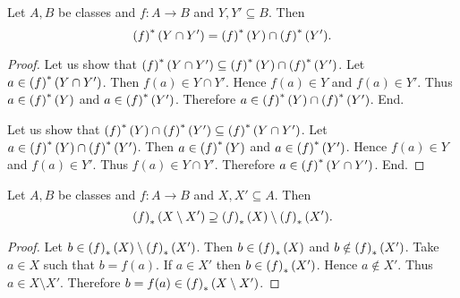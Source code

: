 \documentclass[../../set-theory/set-theory.tex]{subfiles}
\begin{document}
  \begin{forthel}
    \begin{proposition}
      Let $A, B$ be classes and $f : A \to B$ and $Y, Y' \subseteq B$.
      Then \[ \left(f\right)^{*}(Y \cap Y') = \left(f\right)^{*}(Y) \cap \left(f\right)^{*}(Y'). \]
    \end{proposition}
    \begin{proof}
      Let us show that $\left(f\right)^{*}(Y \cap Y') \subseteq \left(f\right)^{*}(Y) \cap \left(f\right)^{*}(Y')$.
        Let $a \in \left(f\right)^{*}(Y \cap Y')$.
        Then $f(a) \in Y \cap Y'$.
        Hence $f(a) \in Y$ and $f(a) \in Y'$.
        Thus $a \in \left(f\right)^{*}(Y)$ and $a \in \left(f\right)^{*}(Y')$.
        Therefore $a \in \left(f\right)^{*}(Y) \cap \left(f\right)^{*}(Y')$.
      End.

      Let us show that $\left(f\right)^{*}(Y) \cap \left(f\right)^{*}(Y') \subseteq \left(f\right)^{*}(Y \cap Y')$.
        Let $a \in \left(f\right)^{*}(Y) \cap \left(f\right)^{*}(Y')$.
        Then $a \in \left(f\right)^{*}(Y)$ and $a \in \left(f\right)^{*}(Y')$.
        Hence $f(a) \in Y$ and $f(a) \in Y'$.
        Thus $f(a) \in Y \cap Y'$.
        Therefore $a \in \left(f\right)^{*}(Y \cap Y')$.
      End.
    \end{proof}
  \end{forthel}

  \begin{forthel}
    \begin{proposition}
      Let $A, B$ be classes and $f : A \to B$ and $X, X' \subseteq A$.
      Then \[ \left(f\right)_{*}(X \setminus X') \supseteq \left(f\right)_{*}(X) \setminus \left(f\right)_{*}(X'). \]
    \end{proposition}
    \begin{proof}
      Let $b \in \left(f\right)_{*}(X) \setminus \left(f\right)_{*}(X')$.
      Then $b \in \left(f\right)_{*}(X)$ and $b \notin \left(f\right)_{*}(X')$.
      Take $a \in X$ such that $b = f(a)$.
      If $a \in X'$ then $b \in \left(f\right)_{*}(X')$.
      Hence $a \notin X'$.
      Thus $a \in X \setminus X'$.
      Therefore $b = f(a) \in \left(f\right)_{*}(X \setminus X')$.
    \end{proof}
  \end{forthel}
\end{document}
